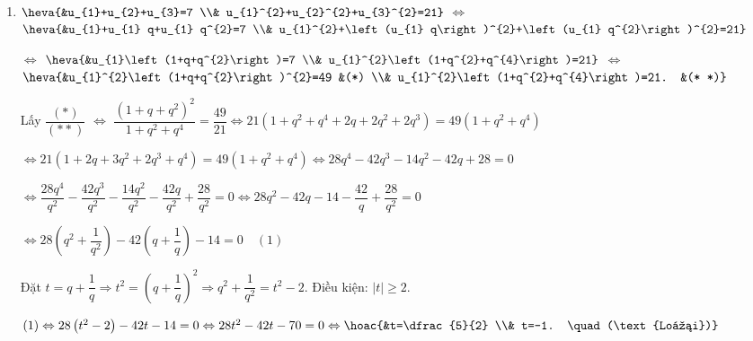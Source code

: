 \begin{vd}
{\begin{enumerate}
			Với $t=2 \Rightarrow q= \pm \sqrt{2}$.
			\begin{itemize}
				\item $q=\sqrt{2} \Rightarrow u_{1}=\dfrac{3}{1+q^{2}}=1$.
				\item $q=-\sqrt{2} \Rightarrow u_{1}=\dfrac{3}{1+q^{2}}=1$.
			\end{itemize}
			Với $t=\dfrac{1}{2} \Rightarrow q= \pm \dfrac{\sqrt{2}}{2}$.
			\begin{itemize}
				\item $q=\dfrac{\sqrt{2}}{2} \Rightarrow u_{1}=\dfrac{3}{1+q^{2}}=2$.
				\item $q=-\dfrac{\sqrt{2}}{2} \Rightarrow u_{1}=\dfrac{3}{1+q^{2}}=2$.
			\end{itemize}
			\item $ \heva{&u_{1}+u_{2}+u_{3}=7 \\& u_{1}^{2}+u_{2}^{2}+u_{3}^{2}=21} $ $ \Leftrightarrow $
			$ \heva{&u_{1}+u_{1} q+u_{1} q^{2}=7 \\& u_{1}^{2}+\left(u_{1} q\right)^{2}+\left(u_{1} q^{2}\right)^{2}=21} $
			
			$ \Leftrightarrow $ $ \heva{&u_{1}\left(1+q+q^{2}\right)=7 \\& u_{1}^{2}\left(1+q^{2}+q^{4}\right)=21} $ $ \Leftrightarrow $
			$ \heva{&u_{1}^{2}\left(1+q+q^{2}\right)^{2}=49 &(*) \\& u_{1}^{2}\left(1+q^{2}+q^{4}\right)=21. &(* *)} $
			
			Lấy $\dfrac{(*)}{(* *)}$ $ \Leftrightarrow $
			$\dfrac{\left(1+q+q^{2}\right)^{2}}{1+q^{2}+q^{4}}=\dfrac{49}{21} \Leftrightarrow 21\left(1+q^{2}+q^{4}+2 q+2 q^{2}+2 q^{3}\right)=49\left(1+q^{2}+q^{4}\right)$
			
			$\Leftrightarrow 21\left(1+2 q+3 q^{2}+2 q^{3}+q^{4}\right)=49\left(1+q^{2}+q^{4}\right) \Leftrightarrow 28 q^{4}-42 q^{3}-14 q^{2}-42 q+28=0$
			
			$\Leftrightarrow \dfrac{28 q^{4}}{q^{2}}-\dfrac{42 q^{3}}{q^{2}}-\dfrac{14 q^{2}}{q^{2}}-\dfrac{42 q}{q^{2}}+\dfrac{28}{q^{2}}=0 \Leftrightarrow 28 q^{2}-42 q-14-\dfrac{42}{q}+\dfrac{28}{q^{2}}=0 $
			
			$\Leftrightarrow 28\left(q^{2}+\dfrac{1}{q^{2}}\right)-42\left(q+\dfrac{1}{q}\right)-14=0 \quad (1)$
			
			Đặt $t=q+\dfrac{1}{q} \Rightarrow t^{2}=\left(q+\dfrac{1}{q}\right)^{2} \Rightarrow q^{2}+\dfrac{1}{q^{2}}=t^{2}-2$. Điều kiện: $|t| \geq 2$.
			
			$(1) \Leftrightarrow 28\left(t^{2}-2\right)-42 t-14=0 \Leftrightarrow 28 t^{2}-42 t-70=0 \Leftrightarrow \hoac{&t=\dfrac{5}{2} \\& t=-1. \quad (\text{Loại})}$
			

\end{enumerate}}
\end{vd}

